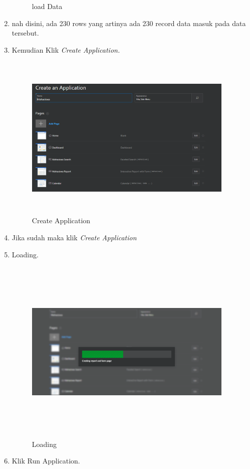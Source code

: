 \begin{enumerate}
\begin{figure}[!htbp]
\caption{load Data}
\label{penanda}
\end{figure}
\item nah disini, ada 230 rows yang artinya ada 230 record data masuk pada data tersebut.
\item Kemudian Klik \textit{Create Application.}
\begin{figure}[!htbp]
\centering
\includegraphics[width=10cm,height=8cm]{figures/H.PNG}
\caption{Create Application}
\label{penanda}
\end{figure}
\item Jika sudah maka klik \textit{Create Application}
\item Loading.
\begin{figure}[!htbp]
\centering
\includegraphics[width=10cm,height=9cm]{figures/I.PNG}
\caption{Loading}
\label{penanda}
\end{figure}
\item Klik Run Application.
\begin{figure}[!htbp]

\end{figure}
\end{enumerate}
